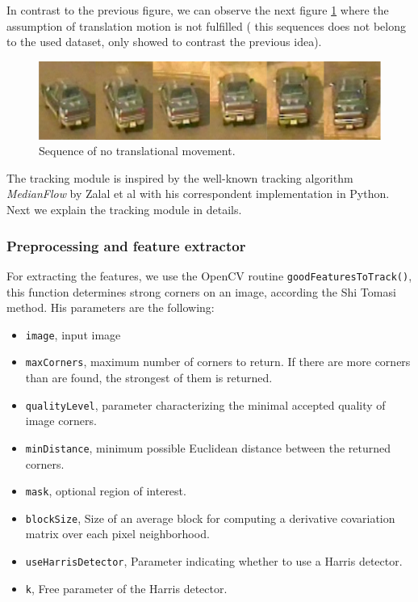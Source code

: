 \documentclass[12pt, a4paper, titlepage,twoside,openright]{article}
\begin{document}
In contrast to the previous figure, we can observe the next figure \ref{track2w} where the assumption of translation motion is not fulfilled ( this sequences does not belong to the used dataset, only showed to contrast the previous idea).

\begin{figure}[H]
\centering         
\includegraphics[width=0.9\linewidth]{changeCamera/out2.png}
\caption{Sequence of no translational movement.} \label{track2w}
\end{figure}




The tracking module is inspired by the well-known tracking algorithm \textit{MedianFlow} by Zalal et al\cite{medianFlow} with his correspondent implementation in Python\cite{medianFlowPython}. Next we explain the tracking module in details.


\subsubsection{Preprocessing and feature extractor}


For extracting the features, we use the OpenCV routine \texttt{goodFeaturesToTrack()}, this function determines strong corners on an image, according the Shi Tomasi method. His parameters are the following:
 
\begin{itemize}

\item \texttt{image}, input image

\item \texttt{maxCorners}, maximum number of corners to return. If there are more corners than are found, the strongest of them is returned.
\item \texttt{qualityLevel}, parameter characterizing the minimal accepted quality of image corners.
\item \texttt{minDistance}, minimum possible Euclidean distance between the returned corners.
\item \texttt{mask}, optional region of interest.
\item \texttt{blockSize}, Size of an average block for computing a derivative covariation matrix over each pixel neighborhood.
\item \texttt{useHarrisDetector},  Parameter indicating whether to use a Harris detector.
\item \texttt{k},  Free parameter of the Harris detector.

\end{itemize}
 
\end{document}
